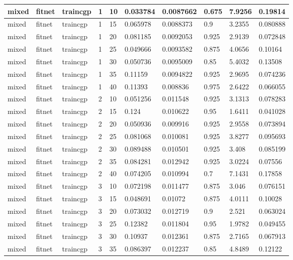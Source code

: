 \begin{longtable}{lllllllll}
mixed & fitnet & traincgp & 1 & 10 & 0.033784 & 0.0087662 & 0.675 & 7.9256 & 0.19814 \\ \hline 
mixed & fitnet & traincgp & 1 & 15 & 0.065978 & 0.0088373 & 0.9 & 3.2355 & 0.080888 \\ \hline 
mixed & fitnet & traincgp & 1 & 20 & 0.081185 & 0.0092053 & 0.925 & 2.9139 & 0.072848 \\ \hline 
mixed & fitnet & traincgp & 1 & 25 & 0.049666 & 0.0093582 & 0.875 & 4.0656 & 0.10164 \\ \hline 
mixed & fitnet & traincgp & 1 & 30 & 0.050736 & 0.0095009 & 0.85 & 5.4032 & 0.13508 \\ \hline 
mixed & fitnet & traincgp & 1 & 35 & 0.11159 & 0.0094822 & 0.925 & 2.9695 & 0.074236 \\ \hline 
mixed & fitnet & traincgp & 1 & 40 & 0.11393 & 0.008836 & 0.975 & 2.6422 & 0.066055 \\ \hline 
mixed & fitnet & traincgp & 2 & 10 & 0.051256 & 0.011548 & 0.925 & 3.1313 & 0.078283 \\ \hline 
mixed & fitnet & traincgp & 2 & 15 & 0.124 & 0.010622 & 0.95 & 1.6411 & 0.041028 \\ \hline 
mixed & fitnet & traincgp & 2 & 20 & 0.050936 & 0.009916 & 0.925 & 2.9558 & 0.073894 \\ \hline 
mixed & fitnet & traincgp & 2 & 25 & 0.081068 & 0.010081 & 0.925 & 3.8277 & 0.095693 \\ \hline 
mixed & fitnet & traincgp & 2 & 30 & 0.089488 & 0.010501 & 0.925 & 3.408 & 0.085199 \\ \hline 
mixed & fitnet & traincgp & 2 & 35 & 0.084281 & 0.012942 & 0.925 & 3.0224 & 0.07556 \\ \hline 
mixed & fitnet & traincgp & 2 & 40 & 0.074205 & 0.010994 & 0.7 & 7.1431 & 0.17858 \\ \hline 
mixed & fitnet & traincgp & 3 & 10 & 0.072198 & 0.011477 & 0.875 & 3.046 & 0.076151 \\ \hline 
mixed & fitnet & traincgp & 3 & 15 & 0.048691 & 0.01072 & 0.875 & 4.0111 & 0.10028 \\ \hline 
mixed & fitnet & traincgp & 3 & 20 & 0.073032 & 0.012719 & 0.9 & 2.521 & 0.063024 \\ \hline 
mixed & fitnet & traincgp & 3 & 25 & 0.12382 & 0.011804 & 0.95 & 1.9782 & 0.049455 \\ \hline 
mixed & fitnet & traincgp & 3 & 30 & 0.10937 & 0.012361 & 0.875 & 2.7165 & 0.067913 \\ \hline 
mixed & fitnet & traincgp & 3 & 35 & 0.086397 & 0.012237 & 0.85 & 4.8489 & 0.12122 \\ \hline 

\end{longtable}

